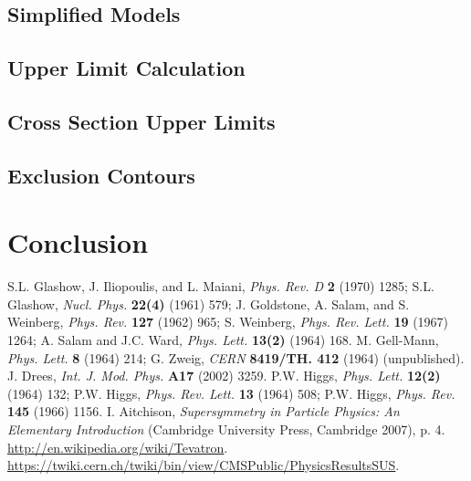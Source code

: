\documentclass[12pt, letterpaper]{report}
\begin{document}
\section{Simplified Models}
\section{Upper Limit Calculation}
\section{Cross Section Upper Limits}
\section{Exclusion Contours}

\chapter{Conclusion}

\begin{thebibliography}{99}
 S.L. Glashow, J. Iliopoulis, and L. Maiani, \textit{Phys. Rev. D} \textbf{2} (1970) 1285; S.L. Glashow, \textit{Nucl. Phys.} \textbf{22(4)} (1961) 579; J. Goldstone, A. Salam, and S. Weinberg, \textit{Phys. Rev.} \textbf{127} (1962) 965; S. Weinberg, \textit{Phys. Rev. Lett.} \textbf{19} (1967) 1264; A. Salam and J.C. Ward, \textit{Phys. Lett.} \textbf{13(2)} (1964) 168.
 M. Gell-Mann, \textit{Phys. Lett.} \textbf{8} (1964) 214; G. Zweig, \textit{CERN} \textbf{8419/TH. 412} (1964) (unpublished).
 J. Drees, \textit{Int. J. Mod. Phys.} \textbf{A17} (2002) 3259.
 P.W. Higgs, \textit{Phys. Lett.} \textbf{12(2)} (1964) 132; P.W. Higgs, \textit{Phys. Rev. Lett.} \textbf{13} (1964) 508; P.W. Higgs, \textit{Phys. Rev.} \textbf{145} (1966) 1156.
 I. Aitchison, \textit{Supersymmetry in Particle Physics: An Elementary Introduction} (Cambridge University Press, Cambridge 2007), p. 4.
 \url{http://en.wikipedia.org/wiki/Tevatron}.
 \url{https://twiki.cern.ch/twiki/bin/view/CMSPublic/PhysicsResultsSUS}.
\end{thebibliography}
\end{document}
